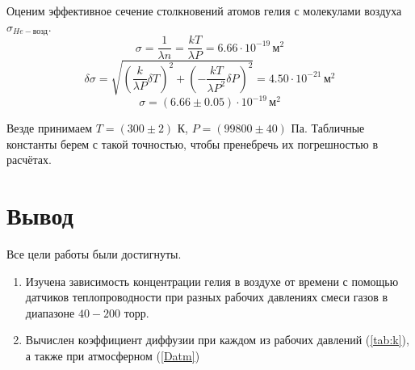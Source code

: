 \documentclass[a4paper,12pt]{article} %
\begin{document}
\begin{enumerate}
  Оценим эффективное сечение столкновений атомов гелия с молекулами воздуха $\sigma_{He-\text{возд}}$.
  \begin{equation}
  \sigma = \frac{1}{\lambda n} = \frac{kT}{\lambda P} = 6.66 \cdot 10^{-19} \, \text{м}^2
  \end{equation}
  \begin{equation}
  \delta \sigma = \sqrt{\left( \frac{k}{\lambda P} \delta T \right)^2 + \left( -\frac{kT}{\lambda P^2} \delta P \right)^2} = 4.50 \cdot 10^{-21} \, \text{м}^2
  \end{equation}
  \begin{equation}
    \sigma = (6.66 \pm 0.05) \cdot 10^{-19} \, \text{м}^2
  \end{equation}

  Везде принимаем $T = (300 \pm 2)$ К, $P = (99800 \pm 40) $ Па. Табличные константы берем с такой точностью, чтобы пренебречь их погрешностью в расчётах.

\end{enumerate}

\section*{Вывод}

Все цели работы были достигнуты.

\begin{enumerate}
  \item Изучена зависимость концентрации гелия в воздухе от времени с помощью датчиков теплопроводности при разных рабочих давлениях смеси газов в диапазоне $40-200$ торр. 

  \item Вычислен коэффициент диффузии при каждом из рабочих давлений (\ref{tab:k}), а также при атмосферном (\ref{Datm}) 
\end{enumerate}
\end{document}
